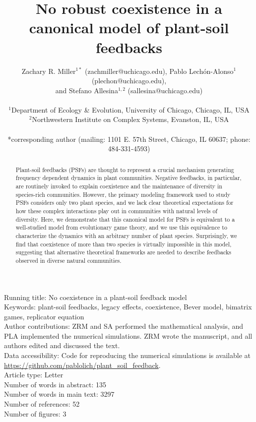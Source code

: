 \documentclass[11pt]{article}
\title{No robust coexistence in a canonical model of plant-soil feedbacks}
\date{}
\author{Zachary R. Miller$^{1*}$ (zachmiller@uchicago.edu), Pablo Lech\'{o}n-Alonso$^{1}$ (plechon@uchicago.edu),\\ and Stefano Allesina$^{1,2}$ (sallesina@uchicago.edu) \\
	\\
	\normalsize{$^{1}$Department of Ecology \& Evolution, University of Chicago, Chicago, IL, USA}\\
	\normalsize{$^{2}$Northwestern Institute on Complex Systems, Evanston, IL, USA}\\
	\\
	\normalsize{*corresponding author (mailing: 1101 E. 57th Street, Chicago, IL 60637; phone: 484-331-4593)}\\
}
\begin{document}
	
\maketitle
{}

\noindent Running title: No coexistence in a plant-soil feedback model\\
Keywords: plant-soil feedbacks, legacy effects, coexistence, Bever model, bimatrix games, replicator equation \\

\noindent Author contributions: ZRM and SA performed the mathematical analysis, and PLA implemented the numerical simulations. ZRM wrote the manuscript, and all authors edited and discussed the text.\\

\noindent Data accessibility: Code for reproducing the numerical simulations is available at\\ \url{https://github.com/pablolich/plant_soil_feedback}.\\

\noindent Article type: Letter\\
Number of words in abstract: 135\\
Number of words in main text: 3297\\
Number of references: 52 \\
Number of figures: 3

\pagebreak

\linenumbers

\begin{abstract}
Plant-soil feedbacks (PSFs) are thought to represent a crucial mechanism generating frequency dependent dynamics in plant communities. Negative feedbacks, in particular, are routinely invoked to explain coexistence and the maintenance of diversity in species-rich communities. However, the primary modeling framework used to study PSFs considers only two plant species, and we lack clear theoretical expectations for how these complex interactions play out in communities with natural levels of diversity. Here, we demonstrate that this canonical model for PSFs is equivalent to a well-studied model from evolutionary game theory, and we use this equivalence to characterize the dynamics with an arbitrary number of plant species. Surprisingly, we find that coexistence of more than two species is virtually impossible in this model, suggesting that alternative theoretical frameworks are needed to describe feedbacks observed in diverse natural communities. 
\end{abstract}
\end{document}
